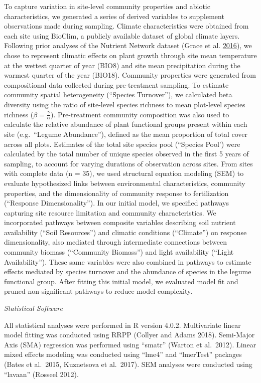 \documentclass[twoside,12pt,final]{ucthesis-CA2012}
\begin{document}
\begin{ucmainmatter}
To capture variation in site-level community properties and abiotic characteristics, we generated a series of derived variables to supplement observations made during sampling. Climate characteristics were obtained from each site using BioClim, a publicly available dataset of global climate layers. Following prior analyses of the Nutrient Network dataset (Grace et al. \protect\hyperlink{ref-Grace2016a}{2016}), we chose to represent climatic effects on plant growth through site mean temperature at the wettest quarter of year (BIO8) and site mean precipitation during the warmest quarter of the year (BIO18).
Community properties were generated from compositional data collected during pre-treatment sampling. To estimate community spatial heterogeneity (``Species Turnover''), we calculated beta diversity using the ratio of site-level species richness to mean plot-level species richness (\(\beta=\frac{\gamma}{\alpha}\)). Pre-treatment community composition was also used to calculate the relative abundance of plant functional groups present within each site (e.g.~``Legume Abundance''), defined as the mean proportion of total cover across all plots. Estimates of the total site species pool (``Species Pool') were calculated by the total number of unique species observed in the first 5 years of sampling, to account for varying durations of observation across sites.
From sites with complete data (n = 35), we used structural equation modeling (SEM) to evaluate hypothesized links between environmental characteristics, community properties, and the dimensionality of community response to fertilization (``Response Dimensionality''). In our initial model, we specified pathways capturing site resource limitation and community characteristics. We incorporated pathways between composite variables describing soil nutrient availability (``Soil Resources'') and climatic conditions (``Climate'') on response dimensionality, also mediated through intermediate connections between community biomass (``Community Biomass'') and light availability (``Light Availability''). These same variables were also combined in pathways to estimate effects mediated by species turnover and the abundance of species in the legume functional group. After fitting this initial model, we evaluated model fit and pruned non-significant pathways to reduce model complexity.

\emph{Statistical Software}

All statistical analyses were performed in R version 4.0.2. Multivariate linear model fitting was conducted using RRPP (Collyer and Adams 2018). Semi-Major Axis (SMA) regression was performed using ``smatr'' (Warton et al.~2012). Linear mixed effects modeling was conducted using ``lme4'' and ``lmerTest'' packages (Bates et al.~2015, Kuznetsova et al.~2017). SEM analyses were conducted using ``lavaan'' (Rosseel 2012).


\end{ucmainmatter}
\end{document}
